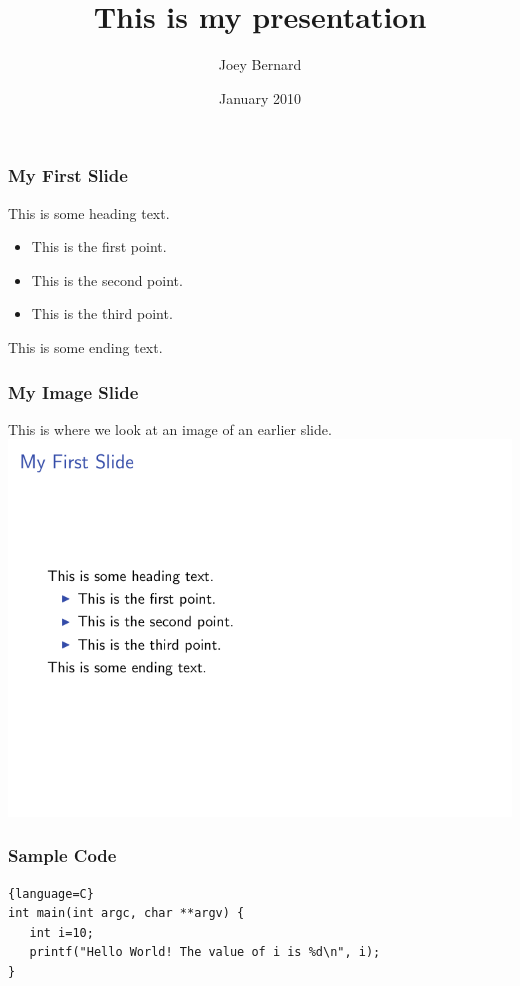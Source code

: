 \documentclass{beamer}
\title{This is my presentation}
\author{Joey Bernard}
\date{January 2010}
\begin{document}
\maketitle

\begin{frame}
   \frametitle{My First Slide}
   This is some heading text.
   \begin{itemize}
      \item This is the first point.
      \item This is the second point.
      \item This is the third point.
   \end{itemize}
   This is some ending text.
\end{frame}
\begin{frame}
   \frametitle{My Image Slide}
   This is where we look at an image of an earlier slide.
   \includegraphics[angle=180,scale=0.5]{slide1.png}
\end{frame}
\begin{frame}[fragile,shrink=5]
   \frametitle{Sample Code}
   \begin{lstlisting}{language=C}
int main(int argc, char **argv) {
   int i=10;
   printf("Hello World! The value of i is %d\n", i);
}
   \end{lstlisting}
\end{frame}
\end{document}
